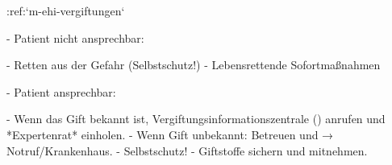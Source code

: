 :ref:`m-ehi-vergiftungen`
\begin{itemize}
    -   Patient nicht ansprechbar:
    \begin{itemize}
        -   Retten aus der Gefahr (Selbstschutz!)
        -   Lebensrettende Sofortmaßnahmen
    \end{itemize}
    -   Patient ansprechbar:
    \begin{itemize}
        -   Wenn das Gift bekannt ist, Vergiftungsinformationszentrale
        () anrufen und *Expertenrat* einholen.
        -   Wenn Gift unbekannt: Betreuen und → Notruf/Krankenhaus.
        -   Selbstschutz!
        -   Giftstoffe sichern und mitnehmen.
    \end{itemize}
\end{itemize}